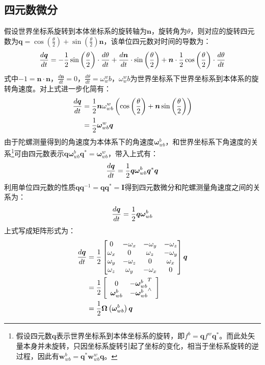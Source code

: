 \subsection{四元数微分}
假设世界坐标系旋转到本体坐标系的旋转轴为$\bm{n}$，旋转角为$\theta$，则对应的旋转四元数为$\bm{q}=\cos\left(\frac{\theta}{2}\right)+\sin\left(\frac{\theta}{2}\right)\bm{n}$，该单位四元数对时间的导数为：
\begin{equation}
\centering
\frac{d\bm{q}}{dt}=-\frac{1}{2}\sin\left(\frac{\theta}{2}\right)\cdot\frac{d\theta}{dt}+\frac{d\bm{n}}{dt}\cdot\sin\left(\frac{\theta}{2}\right)+\bm{n}\cdot\frac{1}{2}\cos\left(\frac{\theta}{2}\right)\cdot\frac{d\theta}{dt}
\end{equation}
式中$-1=\bm{n}\cdot\bm{n}$，$\frac{d\bm{n}}{dt}=0$，$\frac{d\theta}{dt}=\omega^w_wb$，$\omega^w_wb$为世界坐标系下世界坐标系到本体系的旋转角速度。对上式进一步化简有：
\begin{equation}
\centering
\begin{aligned}
\frac{d\bm{q}}{dt}&=\frac{1}{2}\bm{n}\omega_{wb}^w\left(\cos\left(\frac{\theta}{2}\right)+\bm{n}\sin\left(\frac{\theta}{2}\right)\right)\\
&=\frac{1}{2}\bm{\omega}^w_{wb}\bm{q}
\end{aligned}
\end{equation}
由于陀螺测量得到的角速度为本体系下的角速度$\bm{\omega}_{wb}^b$，和世界坐标系下角速度的关系\footnote{假设四元数$\bm{q}$表示世界坐标系到本体坐标系的旋转，即$f^b=\bm{q}f^w\bm{q}^\ast$。而此处矢量本身并未旋转，只因坐标系旋转引起了坐标的变化，相当于坐标系旋转的逆过程，因此有$\bm{w}^b_{wb}=\bm{q}^\ast\bm{w}^w_{wb}\bm{q}$。}可由四元数表示$\bm{q}\bm{\omega}_{wb}^b\bm{q}^\ast=\bm{\omega}_{wb}^w$，带入上式有：
\begin{equation}
\centering
\frac{d\bm{q}}{dt}=\frac{1}{2}\bm{q}\bm{\omega}_{wb}^b\bm{q}^\ast\bm{q}
\end{equation}
利用单位四元数的性质$\bm{q}\bm{q}^{-1}=\bm{q}\bm{q}^\ast=\bm{I}$得到四元数微分和陀螺测量角速度之间的关系为：
\begin{equation}
\centering
\frac{d\bm{q}}{dt}=\frac{1}{2}\bm{q}\bm{\omega}_{wb}^b
\label{eq.append.b.6}
\end{equation}
上式写成矩阵形式为：
\begin{equation}
\centering
\begin{aligned}
\frac{d\bm{q}}{dt}&=\frac{1}{2}\left[\begin{matrix}
0 & -\omega_x & -\omega_y & -\omega_z \\
\omega_x & 0 & \omega_z & -\omega_y \\
\omega_y & -\omega_z & 0 & \omega_x \\
\omega_z & \omega_y & -\omega_x & 0 
\end{matrix}\right]\bm{q}\\
&=\frac{1}{2}\left[\begin{array}{cc}
0 & -{\bm{\omega}_{wb}^b}^T\\
\bm{\omega}_{wb}^b & -{\bm{\omega}_{wb}^b}^\wedge
\end{array}\right]\\
&=\frac{1}{2}\bm{\Omega}\left(\bm{\omega}_{wb}^b\right)\bm{q}
\end{aligned}
\end{equation}
